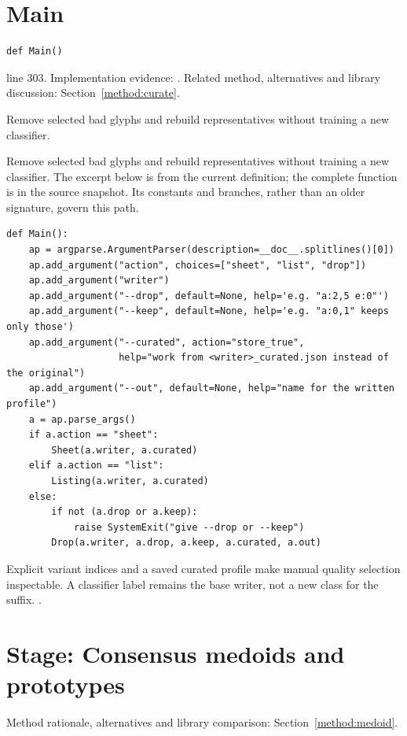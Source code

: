 \section{Main}\label{fn:curate:Main}
\begin{lstlisting}[style=sig]
def Main()
\end{lstlisting}
 line 303. Implementation evidence: \cite{code2026}. Related method, alternatives and library discussion: Section~\ref{method:curate}.


Remove selected bad glyphs and rebuild representatives without training a new classifier.


Remove selected bad glyphs and rebuild representatives without training a new classifier. The excerpt below is from the current definition; the complete function is in the source snapshot. Its constants and branches, rather than an older signature, govern this path.


\begin{lstlisting}[style=plain]
def Main():
    ap = argparse.ArgumentParser(description=__doc__.splitlines()[0])
    ap.add_argument("action", choices=["sheet", "list", "drop"])
    ap.add_argument("writer")
    ap.add_argument("--drop", default=None, help='e.g. "a:2,5 e:0"')
    ap.add_argument("--keep", default=None, help='e.g. "a:0,1" keeps only those')
    ap.add_argument("--curated", action="store_true",
                    help="work from <writer>_curated.json instead of the original")
    ap.add_argument("--out", default=None, help="name for the written profile")
    a = ap.parse_args()
    if a.action == "sheet":
        Sheet(a.writer, a.curated)
    elif a.action == "list":
        Listing(a.writer, a.curated)
    else:
        if not (a.drop or a.keep):
            raise SystemExit("give --drop or --keep")
        Drop(a.writer, a.drop, a.keep, a.curated, a.out)
\end{lstlisting}
Explicit variant indices and a saved curated profile make manual quality selection inspectable. A classifier label remains the base writer, not a new class for the suffix. \cite{code2026,haines2016,pillowdraw}.


\section*{Stage: Consensus medoids and prototypes}
Method rationale, alternatives and library comparison: Section~\ref{method:medoid}.
